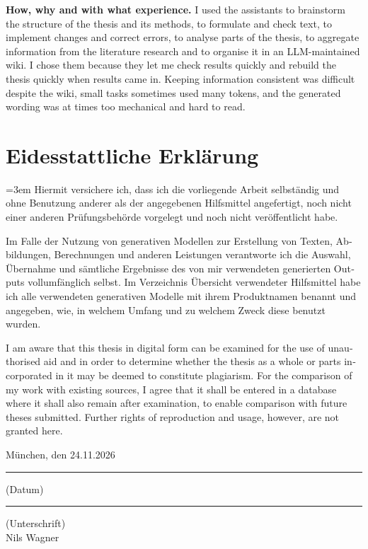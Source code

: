 \documentclass[12pt, a4paper]{article}
\newcommand{\myname}{Nils Wagner}
\theoremstyle{definition}
\begin{document}
\textbf{How, why and with what experience.} I used the assistants to brainstorm the structure of the thesis and its methods, to formulate and check text, to implement changes and correct errors, to analyse parts of the thesis, to aggregate information from the literature research and to organise it in an LLM-maintained wiki. I chose them because they let me check results quickly and rebuild the thesis quickly when results came in. Keeping information consistent was difficult despite the wiki, small tasks sometimes used many tokens, and the generated wording was at times too mechanical and hard to read.

\newpage
\section*{Eidesstattliche Erklärung}
\begin{otherlanguage}{ngerman}
\emergencystretch=3em
\noindent
Hiermit versichere ich, dass ich die vorliegende Arbeit selbständig und ohne Benutzung anderer als der angegebenen Hilfsmittel angefertigt, noch nicht einer anderen Prüfungsbehörde vorgelegt und noch nicht veröffentlicht habe.

\noindent
Im Falle der Nutzung von generativen Modellen zur Erstellung von Texten, Abbildungen, Berechnungen und anderen Leistungen verantworte ich die Auswahl, Übernahme und sämtliche Ergebnisse des von mir verwendeten generierten Outputs vollumfänglich selbst. Im Verzeichnis \glqq Übersicht verwendeter Hilfsmittel\grqq{} habe ich alle verwendeten generativen Modelle mit ihrem Produktnamen benannt und angegeben, wie, in welchem Umfang und zu welchem Zweck diese benutzt wurden.

\noindent
\foreignlanguage{english}{I am aware that this thesis in digital form can be examined for the use of unauthorised aid and in order to determine whether the thesis as a whole or parts incorporated in it may be deemed to constitute plagiarism. For the comparison of my work with existing sources, I agree that it shall be entered in a database where it shall also remain after examination, to enable comparison with future theses submitted. Further rights of reproduction and usage, however, are not granted here.}

\vspace{2cm}

\noindent
\begin{minipage}[t]{0.42\textwidth}
München, den 24.11.2026\par
\vspace{0.1cm}
\rule{\linewidth}{0.4pt}\par
(Datum)
\end{minipage}\hfill
\begin{minipage}[t]{0.42\textwidth}
\mbox{}\par
\vspace{0.1cm}
\rule{\linewidth}{0.4pt}\par
(Unterschrift)\\
\myname
\end{minipage}
\end{otherlanguage}
\end{document}
